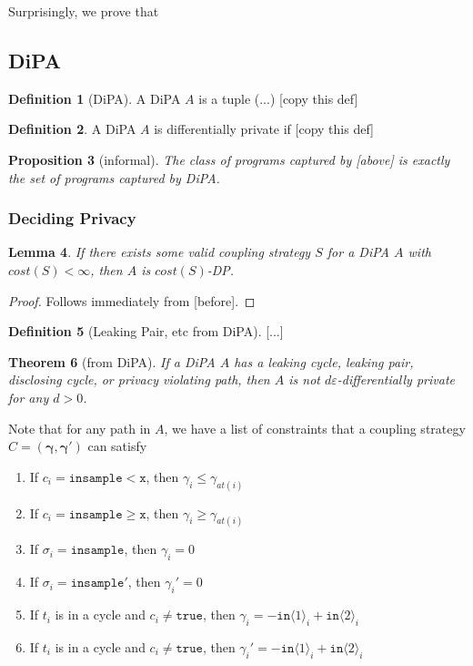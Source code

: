 \documentclass[12pt]{article}
\newcommand{\gguard}[1][x]{\texttt{insample}\geq #1}
\newcommand{\lguard}[1][x]{\texttt{insample} < #1}
\newcommand{\brangle}[1]{\langle #1 \rangle}
\newtheorem{thm}{Theorem}[section]
\newtheorem{lemma}[thm]{Lemma}
\newtheorem{prop}[thm]{Proposition}
\theoremstyle{definition}
\newtheorem{defn}[thm]{Definition}
\begin{document}
Surprisingly, we prove that 


\subsection{DiPA}

\begin{defn}[DiPA]
    A DiPA $A$ is a tuple (...) [copy this def]
\end{defn}

\begin{defn}
    A DiPA $A$ is differentially private if [copy this def]
\end{defn}

\begin{prop}[informal]
    The class of programs captured by [above] is exactly the set of programs captured by DiPA. 
\end{prop}





\subsubsection{Deciding Privacy}


\begin{lemma}
    If there exists some valid coupling strategy $S$ for a DiPA $A$ with $cost(S)<\infty$, then $A$ is $cost(S)$-DP.
\end{lemma}
\begin{proof}
    Follows immediately from [before].
\end{proof}

\begin{defn}[Leaking Pair, etc from DiPA]
    [...]
\end{defn}

\begin{thm}[from DiPA]\label{DiPACounterexamplesThm}
    If a DiPA $A$ has a leaking cycle, leaking pair, disclosing cycle, or privacy violating path, then $A$ is not $d\varepsilon$-differentially private for any $d>0$. 
\end{thm}

Note that for any path in $A$, we have a list of constraints that a coupling strategy $C=(\mathbf{\gamma}, \mathbf{\gamma}')$ can satisfy\begin{enumerate}
    \item If $c_i = \lguard[\texttt{x}]$, then $\gamma_i\leq\gamma_{at(i)}$
    \item If $c_i = \gguard[\texttt{x}]$, then $\gamma_i\geq\gamma_{at(i)}$
    \item If $\sigma_i = \texttt{insample}$, then $\gamma_i=0$
    \item If $\sigma_i = \texttt{insample}'$, then $\gamma_i'=0$
    \item If $t_i$ is in a cycle and $c_i\neq \texttt{true}$, then $\gamma_i = -\texttt{in}\brangle{1}_i+\texttt{in}\brangle{2}_i$
    \item If $t_i$ is in a cycle and $c_i\neq \texttt{true}$, then $\gamma_i' = -\texttt{in}\brangle{1}_i+\texttt{in}\brangle{2}_i$
\end{enumerate}
\end{document}
